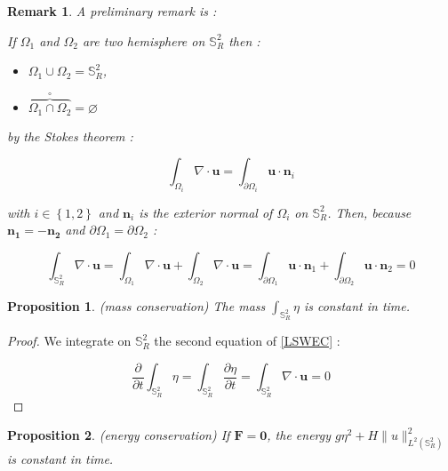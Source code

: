 \documentclass[10pt,a4paper]{amsart}
\def\gint{\displaystyle\int}
\newtheorem{proposition}{Proposition}
\newtheorem{remark}{Remark}
\begin{document}
\begin{remark}
\label{remark_stokes}
A preliminary remark is :

If $\Omega_1$ and $\Omega_2$ are two hemisphere on $\mathbb{S}^2_R$ then :
\begin{itemize}
\item $\Omega_1 \cup \Omega_2 = \mathbb{S}^2_R $,
\item $\overbrace{\Omega_1 \cap \Omega_2}^{\circ} = \varnothing$
\end{itemize}

by the Stokes theorem :

\begin{equation}
\gint_{\Omega_i}  \nabla \cdot \mathbf{u} = \gint_{\partial \Omega_i} \mathbf{u} \cdot \mathbf{n}_i
\end{equation}

with $i \in \left\lbrace 1, 2 \right\rbrace$ and $\mathbf{n}_i$ is the exterior normal of $\Omega_i$ on $\mathbb{S}_R^2$.
Then, because $\mathbf{n_1} = -\mathbf{n_2}$ and $\partial \Omega_1 = \partial \Omega_2$ :

$$\gint_{\mathbb{S}_R^2}  \nabla \cdot \mathbf{u} = \gint_{\Omega_1}  \nabla \cdot \mathbf{u} + \gint_{\Omega_2}  \nabla \cdot \mathbf{u} = \gint_{\partial \Omega_1} \mathbf{u} \cdot \mathbf{n}_1 + \gint_{\partial \Omega_2} \mathbf{u} \cdot \mathbf{n}_2 = 0$$
\end{remark}

\begin{proposition}
(mass conservation)
The mass $\gint_{\mathbb{S}_R^2} \eta$ is constant in time.
\end{proposition}

\begin{proof}
We integrate on $\mathbb{S}_R^2$ the second equation of \eqref{LSWEC} :

$$\dfrac{\partial}{\partial t} \gint_{\mathbb{S}_R^2} \eta = \gint_{\mathbb{S}_R^2} \dfrac{\partial \eta}{\partial t} = \gint_{\mathbb{S}_R^2} \nabla \cdot \mathbf{u} = 0$$
\end{proof}

\begin{proposition}
(energy conservation)
If $\mathbf{F} = \mathbf{0}$, the energy $g  \eta^2 + H \| u \|_{L^2(\mathbb{S}_R^2)}^2$ is constant in time.
\end{proposition}
\end{document}
